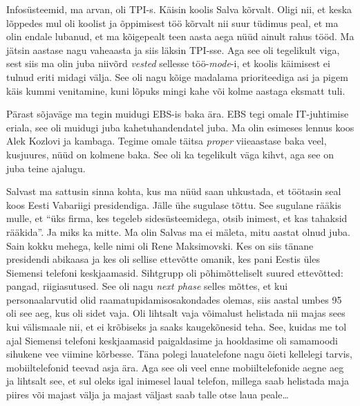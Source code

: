 
Infosüsteemid, ma arvan, oli TPI-s. 
Käisin koolis Salva kõrvalt. Oligi nii, et keska lõppedes mul oli koolist ja 
õppimisest töö kõrvalt nii suur tüdimus peal, et ma olin endale lubanud, et ma 
kõigepealt teen aasta aega nüüd ainult rahus tööd. Ma jätsin aastase nagu 
vaheaasta ja siis läksin TPI-sse. Aga see oli tegelikult viga, sest siis ma 
olin juba niivõrd \emph{vested} sellesse töö-\emph{mode}-i, et koolis 
käimisest ei tulnud eriti midagi välja. See oli nagu kõige madalama 
prioriteediga asi ja pigem käis kummi venitamine, kuni lõpuks mingi kahe või 
kolme aastaga eksmatt tuli. 

Pärast sõjaväge ma tegin muidugi EBS-is baka ära. EBS tegi omale IT-juhtimise 
eriala, see oli muidugi juba kahetuhandendatel juba. Ma olin esimeses lennus 
koos Alek Kozlovi ja  kambaga. Tegime omale täitsa  
\emph{proper} viieaastase baka veel, kusjuures, nüüd on kolmene baka. See oli 
ka tegelikult väga kihvt, aga see on juba teine ajalugu. 


Salvast ma sattusin sinna kohta, kus ma nüüd saan uhkustada, et  töötasin seal 
koos Eesti Vabariigi presidendiga. Jälle ühe sugulase tõttu. See sugulane 
rääkis mulle, et \enquote{üks firma, kes tegeleb sidesüsteemidega, otsib 
inimest, et kas tahaksid rääkida}. Ja miks ka mitte. Ma olin Salvas ma ei 
mäleta, mitu aastat olnud juba. Sain kokku mehega, kelle nimi oli Rene 
Maksimovski. Kes on siis tänane presidendi 
abikaasa ja kes oli  sellise ettevõtte omanik, kes pani Eestis üles Siemensi 
telefoni keskjaamasid. Sihtgrupp oli põhimõtteliselt suured ettevõtted: pangad, 
riigiasutused. See oli nagu \emph{next phase} selles mõttes, et kui 
personaalarvutid olid raamatupidamisosakondades olemas, siis aastal umbes 95 
oli see aeg, kus oli sidet vaja. Oli lihtsalt vaja võimalust helistada nii 
majas sees kui välismaale nii, et ei krõbiseks ja saaks kaugekõnesid teha. See, 
kuidas me tol ajal Siemensi telefoni keskjaamasid paigaldasime ja hooldasime 
oli samamoodi sihukene vee viimine kõrbesse. Täna polegi lauatelefone nagu 
õieti kellelegi tarvis, mobiiltelefonid teevad asja ära. Aga see oli veel enne 
mobiiltelefonide aegne aeg ja lihtsalt see, et sul oleks igal inimesel laual 
telefon, millega saab helistada maja piires või majast välja ja majast väljast 
saab talle otse laua peale\ldots 


